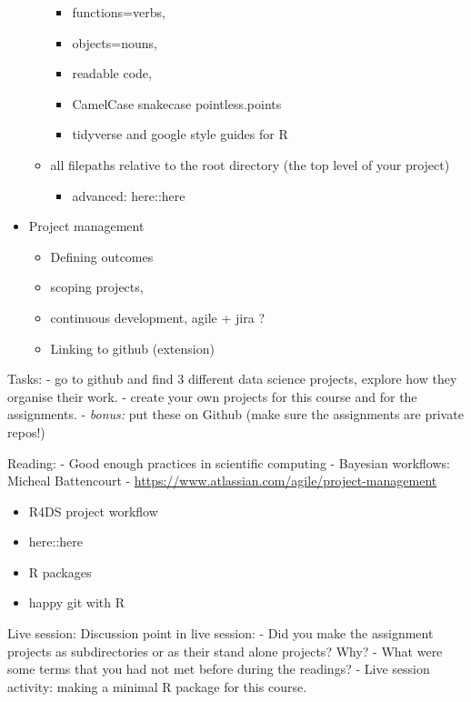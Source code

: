 \documentclass[
  12pt,
]{book}
\providecommand{\tightlist}{%
  \setlength{\itemsep}{0pt}\setlength{\parskip}{0pt}}
\theoremstyle{definition}
\theoremstyle{definition}
\theoremstyle{definition}
\theoremstyle{definition}
\theoremstyle{remark}
\begin{document}
\begin{itemize}
\begin{itemize}
    \begin{itemize}
    \tightlist
    \item
      functions=verbs,
    \item
      objects=nouns,
    \item
      readable code,
    \item
      CamelCase snakecase pointless.points
    \item
      tidyverse and google style guides for R
    \end{itemize}
  \item
    all filepaths relative to the root directory (the top level of your project)

    \begin{itemize}
    \tightlist
    \item
      advanced: here::here
    \end{itemize}
  \end{itemize}
\item
  Project management

  \begin{itemize}
  \tightlist
  \item
    Defining outcomes
  \item
    scoping projects,
  \item
    continuous development, agile + jira ?
  \item
    Linking to github (extension)
  \end{itemize}
\end{itemize}

Tasks:
- go to github and find 3 different data science projects, explore how they organise their work.
- create your own projects for this course and for the assignments.
- \emph{bonus:} put these on Github (make sure the assignments are private repos!)

Reading:
- Good enough practices in scientific computing
- Bayesian workflows: Micheal Battencourt
- \url{https://www.atlassian.com/agile/project-management}

\begin{itemize}
\tightlist
\item
  R4DS project workflow
\item
  here::here
\item
  R packages
\item
  happy git with R
\end{itemize}

Live session:
Discussion point in live session:
- Did you make the assignment projects as subdirectories or as their stand alone projects? Why?
- What were some terms that you had not met before during the readings?
- Live session activity: making a minimal R package for this course.
\end{document}
